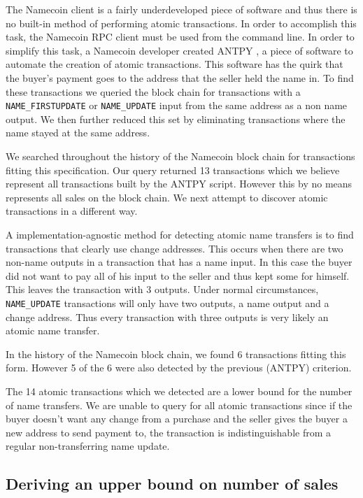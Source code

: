 The Namecoin client is a fairly underdeveloped piece of software and thus there is no built-in method of performing atomic transactions. In order to accomplish this task, the Namecoin RPC client must be used from the command line. In order to simplify this task, a Namecoin developer created ANTPY \cite{antyp}, a piece of software to automate the creation of atomic transactions. This software has the quirk that the buyer's payment goes to the address that the seller held the name in. To find these transactions we queried the block chain for transactions with a {\tt NAME\_FIRSTUPDATE} or {\tt NAME\_UPDATE} input from the same address as a non name output. We then further reduced this set by eliminating transactions where the name stayed at the same address.

We searched throughout the history of the Namecoin block chain for transactions fitting this specification. Our query returned 13 transactions which we believe represent all transactions built by the ANTPY script. However this by no means represents all sales on the block chain. We next attempt to discover atomic transactions in a different way.

A implementation-agnostic method for detecting atomic name transfers is to find transactions that clearly use change addresses. This occurs when there are two non-name outputs in a transaction that has a name input. In this case the buyer did not want to pay all of his input to the seller and thus kept some for himself. This leaves the transaction with 3 outputs. Under normal circumstances, {\tt NAME\_UPDATE} transactions will only have two outputs, a name output and a change address. Thus every transaction with three outputs is very likely an atomic name transfer.

In the history of the Namecoin block chain, we found 6 transactions fitting this form. However 5 of the 6 were also detected by the previous (ANTPY) criterion.

The 14 atomic transactions which we detected are a lower bound for the number of name transfers. We are unable to query for all atomic transactions since if the buyer doesn't want any change from a purchase and the seller gives the buyer a new address to send payment to, the transaction is indistinguishable from a regular non-transferring name update.

\subsection{Deriving an upper bound on number of sales}

